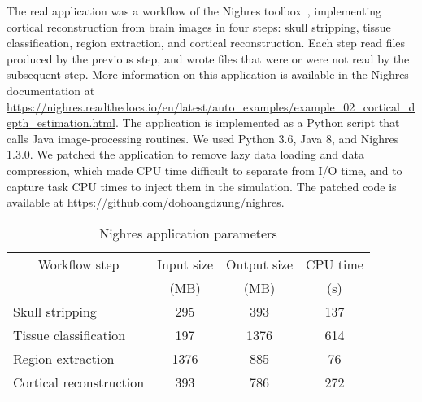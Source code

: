 \documentclass[conference]{IEEEtran}
\begin{document}
        The real application was a workflow of the Nighres
        toolbox~\cite{huntenburg2018nighres}, implementing cortical
        reconstruction from brain images in four steps: skull stripping,
        tissue classification, region extraction, and cortical
        reconstruction. Each step read files produced by the previous step,
        and wrote files that were or were not read by the subsequent step.
        More information on this application is available in the Nighres
        documentation at
        \url{https://nighres.readthedocs.io/en/latest/auto_examples/example_02_cortical_depth_estimation.html}.
        The application is implemented as a Python script that calls Java
        image-processing routines. We used Python 3.6, Java 8, and Nighres
        1.3.0. We patched the application to remove lazy data loading and
        data compression, which made CPU time difficult to separate from
        I/O time, and to capture task CPU times to inject them in the
        simulation. The patched code is available at
        \url{https://github.com/dohoangdzung/nighres}.
        \begin{table}[t]
            \centering
            \begin{tabular}{lccc}
            \toprule
                \multicolumn{1}{c}{Workflow step}& Input size       & Output size      & CPU time\\
                                       & (MB)             & (MB)             & (s)\\
            \midrule
               Skull stripping         &  295             & 393               & 137 \\
               Tissue classification   &  197              & 1376              & 614 \\
               Region extraction       &  1376             & 885              & 76 \\
               Cortical reconstruction &  393              & 786              & 272\\
            \bottomrule
            \end{tabular} 
            \caption{Nighres application parameters}
            \label{table:nighres_stats}
            \end{table}
\end{document}
